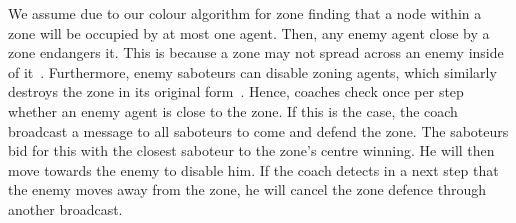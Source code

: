 We assume due to our colour algorithm for zone finding that a node within a zone will be occupied by at most one agent. Then, any enemy agent close by a zone endangers it. This is because a zone may not spread across an enemy inside of it~\cite{ahlbrecht_mapc_2014}. %
Furthermore, enemy saboteurs can disable zoning agents, which similarly destroys the zone in its original form~\cite{ahlbrecht_mapc_2014}. %
Hence, coaches check once per step whether an enemy agent is close to the zone. If this is the case, the coach broadcast a message to all saboteurs to come and defend the zone. The saboteurs bid for this with the closest saboteur to the zone's centre winning. He will then move towards the enemy to disable him. If the coach detects in a next step that the enemy moves away from the zone, he will cancel the zone defence through another broadcast.


